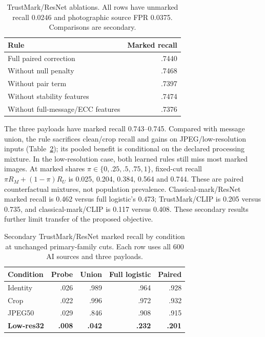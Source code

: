 \documentclass[conference]{IEEEtran}
\begin{document}
\begin{table}[t]
\caption{TrustMark/ResNet ablations. All rows have unmarked recall 0.0246 and
photographic source FPR 0.0375. Comparisons are secondary.}
\label{tab:ablations}\centering\footnotesize
\begin{tabular}{lr}\toprule
Rule & Marked recall\\\midrule
Full paired correction & .7440\\
Without null penalty & .7468\\
Without pair term & .7397\\
Without stability features & .7474\\
Without full-message/ECC features & .7376\\
\bottomrule\end{tabular}\end{table}

The three payloads have marked recall 0.743--0.745.
Compared with message union, the rule sacrifices clean/crop recall and gains on
JPEG/low-resolution inputs (Table~\ref{tab:conditions}); its pooled benefit is
conditional on the declared processing mixture. In the low-resolution case,
both learned rules still miss most marked images.
At marked shares $\pi\in\{0,.25,.5,.75,1\}$, fixed-cut recall
$\pi R_M+(1-\pi)R_U$ is 0.025, 0.204, 0.384, 0.564 and 0.744.
These are paired counterfactual mixtures, not population prevalence.
Classical-mark/ResNet marked recall is 0.462 versus full logistic's 0.473;
TrustMark/CLIP is 0.205 versus 0.735, and classical-mark/CLIP is 0.117 versus
0.408. These secondary results further limit transfer of the proposed objective.

\begin{table}[t]
\caption{Secondary TrustMark/ResNet marked recall by condition at unchanged
primary-family cuts. Each row uses all 600 AI sources and three payloads.}
\label{tab:conditions}\centering\footnotesize
\begin{tabular}{lrrrr}\toprule
Condition & Probe & Union & Full logistic & Paired\\\midrule
Identity & .026 & .989 & .964 & .928\\
Crop & .022 & .996 & .972 & .932\\
JPEG50 & .029 & .846 & .908 & .915\\
\textbf{Low-res32} & \textbf{.008} & \textbf{.042} & \textbf{.232} & \textbf{.201}\\
\bottomrule\end{tabular}\end{table}
\end{document}
